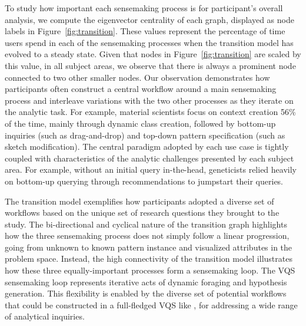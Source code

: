 \par To study how important each sensemaking process is for participant's overall analysis, we compute the eigenvector centrality of each graph, displayed as node labels in Figure~\ref{fig:transition}. These values represent the percentage of time users spend in each of the sensemaking processes when the transition model has evolved to a steady state. Given that nodes in Figure~\ref{fig:transition} are scaled by this value, in all subject areas, we observe that there is always a prominent node connected to two other smaller nodes. Our observation demonstrates how participants often construct a central workflow around a main sensemaking process and interleave variations with the two other processes as they iterate on the analytic task. For example, material scientists focus on context creation 56\% of the time, mainly through dynamic class creation, followed by bottom-up inquiries (such as drag-and-drop) and top-down pattern specification (such as sketch modification). 
The central paradigm adopted by each use case is tightly coupled with characteristics of the analytic challenges presented by each subject area. For example, without an initial query in-the-head, geneticists relied heavily on bottom-up querying through recommendations to jumpstart their queries. 
\par The transition model exemplifies how participants adopted a diverse set of workflows based on the unique set of research questions they brought to the study. The bi-directional and cyclical nature of the transition graph highlights how the three sensemaking process does not simply follow a linear progression, going from unknown to known pattern instance and visualized attributes in the problem space. Instead, the high connectivity of the transition model illustrates how these three equally-important processes form a sensemaking loop. The VQS sensemaking loop represents iterative acts of dynamic foraging and hypothesis generation. This flexibility is enabled by the diverse set of potential workflows that could be constructed in a full-fledged VQS like \zvpp, for addressing a wide range of analytical inquiries.%
